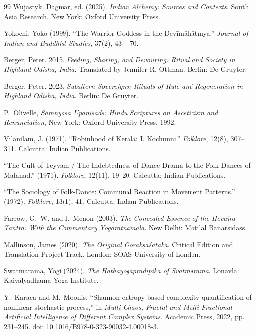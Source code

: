\documentclass[11pt,twoside,letterpaper]{article}
\begin{document}
\begin{thebibliography}{99}
Wujastyk, Dagmar, ed. (2025). \textit{Indian Alchemy: Sources and Contexts}. South Asia Research. New York: Oxford University Press.

Yokochi, Yoko (1999). ``The Warrior Goddess in the Devīmāhātmya.'' \textit{Journal of Indian and Buddhist Studies}, 37(2), 43 -- 70.

Berger, Peter. 2015. \textit{Feeding, Sharing, and Devouring: Ritual and Society in Highland Odisha, India}. Translated by Jennifer R. Ottman. Berlin: De Gruyter.

Berger, Peter. 2023. \textit{Subaltern Sovereigns: Rituals of Rule and Regeneration in Highland Odisha, India}. Berlin: De Gruyter.

P.~Olivelle, \emph{Samnyasa Upanisads: Hindu Scriptures on Asceticism and 
Renunciation}, New York: Oxford University Press, 1992.

Vilanilam, J. (1971). ``Robinhood of Kerala: I. Kochunni.'' \textit{Folklore}, 12(8), 307--311. Calcutta: Indian Publications.

``The Cult of Teyyam / The Indebtedness of Dance Drama to the Folk Dances of Malanad.'' (1971). \textit{Folklore}, 12(11), 19--20. Calcutta: Indian Publications.

``The Sociology of Folk-Dance: Communal Reaction in Movement Patterns.'' (1972). \textit{Folklore}, 13(1), 41. Calcutta: Indian Publications.

Farrow, G.~W. and I.~Menon (2003). \textit{The Concealed Essence of the Hevajra Tantra: With the Commentary Yogaratnamala}. New Delhi: Motilal Banarsidass.

Mallinson, James (2020). \textit{The Original Gorakṣaśataka}. Critical Edition and Translation Project Track. London: SOAS University of London.

Swatmarama, Yogi (2024). \textit{The Haṭhayogapradīpikā of Svātmārāma}. Lonavla: Kaivalyadhama Yoga Institute.

Y.~Karaca and M.~Moonis, ``Shannon entropy-based complexity quantification of nonlinear stochastic process,'' in \textit{Multi-Chaos, Fractal and Multi-Fractional Artificial Intelligence of Different Complex Systems}. Academic Press, 2022, pp. 231--245. doi: 10.1016/B978-0-323-90032-4.00018-3.


\end{thebibliography}
\end{document}
